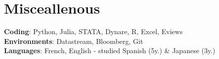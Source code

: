 \documentclass[letterpaper,10pt]{article}
\makeatletter
\newcommand{\up}[1]{\textsuperscript{#1}}
\newcommand{\resumeItem}[1]{
    \item\small{
            {#1 \vspace{-2pt}}
    }
}
\newcommand{\resumeSubheading}[4]{
    \vspace{-2pt}\item
    \begin{tabular*}{0.97\textwidth}[t]{l@{\extracolsep{\fill}}r}
        \textbf{#1}       & #2                 \\
        \textit{\small#3} & \textit{\small #4} \\
    \end{tabular*}\vspace{-7pt}
}
\newcommand{\resumeSubHeadingListStart}{\begin{itemize}[leftmargin=0.15in, label={}]}
\newcommand{\resumeSubHeadingListEnd}{\end{itemize}}
\newcommand{\resumeItemListStart}{\begin{itemize}}
\newcommand{\resumeItemListEnd}{\end{itemize}\vspace{-5pt}}
\makeatother
\begin{document}
\section{Misceallenous}
\begin{itemize}[leftmargin=0.15in, label={}]
\small{\item{
\textbf{Coding}{: Python, Julia, STATA, Dynare, R, Excel, Eviews} \\
\textbf{Environments}{: Datastream, Bloomberg, Git}\\
\textbf{Languages}{: French, English - studied Spanish (5y.) \& Japanese (3y.)} \\
}}
\end{itemize}
\end{document}
